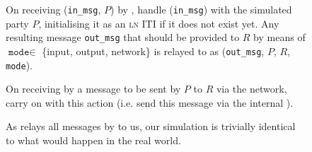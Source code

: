 \begin{figure}[H]
  \begin{simulatorbox}{\simulator}
    \begin{algorithmic}[1]
      \State On receiving (\texttt{in\_msg}, $P$) by \fchan,
      handle (\texttt{in\_msg}) with the simulated party $P$,
      initialising it as an \textsc{ln} ITI if it does not exist yet. Any
      resulting message \texttt{out\_msg} that should be provided to $R$ by
      means of $\texttt{mode} \in$ \{input, output, network\} is relayed to
      \fchan as (\texttt{out\_msg}, $P$, $R$, \texttt{mode}).
      \Statex

      \State On receiving by \fchan a message to be sent by $P$ to $R$ via the
      network, carry on with this action (i.e. send this message via the
      internal \adversary). 
    \end{algorithmic}

    As \fchan relays all messages by \environment to us, our simulation is
    trivially identical to what would happen in the real world.
  \end{simulatorbox}
\end{figure}

